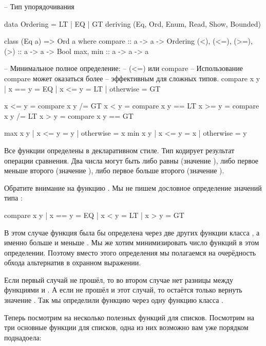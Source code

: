 \begin{code}
-- Тип упорядочивания

data  Ordering  =  LT | EQ | GT
          deriving (Eq, Ord, Enum, Read, Show, Bounded)


class  (Eq a) => Ord a  where
    compare              :: a -> a -> Ordering
    (<), (<=), (>=), (>) :: a -> a -> Bool
    max, min             :: a -> a -> a

        -- Минимальное полное определение:
        --      (<=) или compare
        -- Использование compare может оказаться более 
        -- эффективным для сложных типов.
    compare x y
         | x == y    =  EQ
         | x <= y    =  LT
         | otherwise =  GT

    x <= y           =  compare x y /= GT
    x <  y           =  compare x y == LT
    x >= y           =  compare x y /= LT
    x >  y           =  compare x y == GT

    max x y 
         | x <= y    =  y
         | otherwise =  x
    min x y
         | x <= y    =  x
         | otherwise =  y
\end{code}

Все функции определены в декларативном стиле. Тип  кодирует
результат операции сравнения. Два числа могут быть либо равны (значение
), либо первое меньше второго (значение ), либо первое
больше второго (значение ).

Обратите внимание на функцию . Мы не пишем дословное
определение значений типа :


\begin{code}
    compare x y
         | x == y    =  EQ
         | x <  y    =  LT
         | x >  y    =  GT
\end{code}

В этом случае функция  была бы определена через две других
функции класса , а именно больше \In{>} и меньше \In{<}. Мы же
хотим минимизировать число функций в этом определении. Поэтому вместо
этого определения мы полагаемся на очерёдность обхода альтернатив в
охранном выражении.

Если первый случай не прошёл, то во втором случае нет разницы между
функциями \In{<} и \In{<=}. А если не прошёл и этот случай, то остаётся
только вернуть значение . Так мы определили функцию 
через одну функцию класса .

Теперь посмотрим на несколько полезных функций для списков. Посмотрим на
три основные функции для списков, одна из них возможно вам уже порядком
поднадоела:


